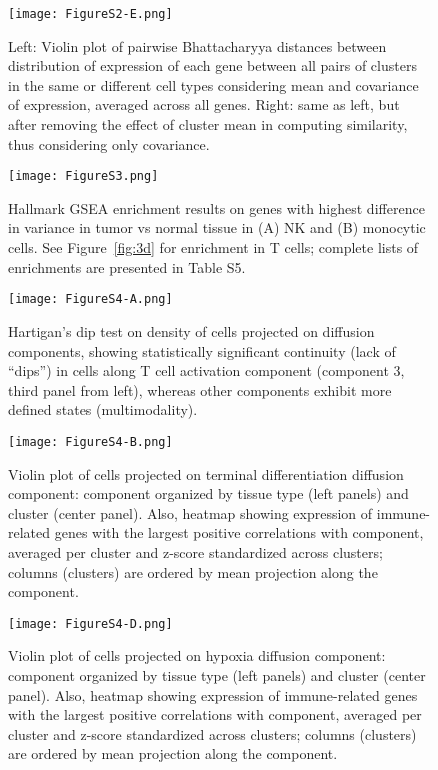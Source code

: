 \begin{figure}
\centering
\texttt{[image: FigureS2-E.png]}
\caption{Left: Violin plot of pairwise Bhattacharyya distances between distribution of expression of each gene between all pairs of clusters in the same or different cell types considering mean and covariance of expression, averaged across all genes.
Right: same as left, but after removing the effect of cluster mean in computing similarity, thus considering only covariance.
}
\label{fig:s2e}
\end{figure}

\begin{figure}
\centering
\texttt{[image: FigureS3.png]}
\caption{Hallmark GSEA enrichment results on genes with highest difference in variance in tumor vs normal tissue in (A) NK and (B) monocytic cells. See Figure~\ref{fig:3d}  for enrichment in T cells; complete lists of enrichments are presented in Table S5.
}
\label{fig:s3}
\end{figure}


\begin{figure}
\centering
\texttt{[image: FigureS4-A.png]}
\caption{Hartigan’s dip test on density of cells projected on diffusion components, showing statistically significant continuity (lack of “dips”) in cells along T cell activation component (component 3, third panel from left), whereas other components exhibit more defined states (multimodality).
}
\label{fig:s4a}
\end{figure}

\begin{figure}
\centering
\texttt{[image: FigureS4-B.png]}
\caption{Violin plot of cells projected on terminal differentiation diffusion component: component organized by tissue type (left panels) and cluster (center panel). Also, heatmap showing expression of immune-related genes with the largest positive correlations with component, averaged per cluster and z-score standardized across clusters; columns (clusters) are ordered by mean projection along the component.
}
\label{fig:s4b}
\end{figure}

\begin{figure}
\centering
\texttt{[image: FigureS4-D.png]}
\caption{Violin plot of cells projected on hypoxia diffusion component: component organized by tissue type (left panels) and cluster (center panel). Also, heatmap showing expression of immune-related genes with the largest positive correlations with component, averaged per cluster and z-score standardized across clusters; columns (clusters) are ordered by mean projection along the component.
}
\label{fig:s4d}
\end{figure}


